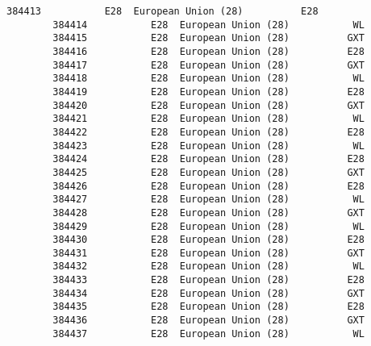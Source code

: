 \documentclass[11pt]{article}
\begin{document}
\begin{Verbatim}[commandchars=\\\{\}]
        384413           E28  European Union (28)          E28   
        384414           E28  European Union (28)           WL   
        384415           E28  European Union (28)          GXT   
        384416           E28  European Union (28)          E28   
        384417           E28  European Union (28)          GXT   
        384418           E28  European Union (28)           WL   
        384419           E28  European Union (28)          E28   
        384420           E28  European Union (28)          GXT   
        384421           E28  European Union (28)           WL   
        384422           E28  European Union (28)          E28   
        384423           E28  European Union (28)           WL   
        384424           E28  European Union (28)          E28   
        384425           E28  European Union (28)          GXT   
        384426           E28  European Union (28)          E28   
        384427           E28  European Union (28)           WL   
        384428           E28  European Union (28)          GXT   
        384429           E28  European Union (28)           WL   
        384430           E28  European Union (28)          E28   
        384431           E28  European Union (28)          GXT   
        384432           E28  European Union (28)           WL   
        384433           E28  European Union (28)          E28   
        384434           E28  European Union (28)          GXT   
        384435           E28  European Union (28)          E28   
        384436           E28  European Union (28)          GXT   
        384437           E28  European Union (28)           WL   
        

\end{Verbatim}
\end{document}
